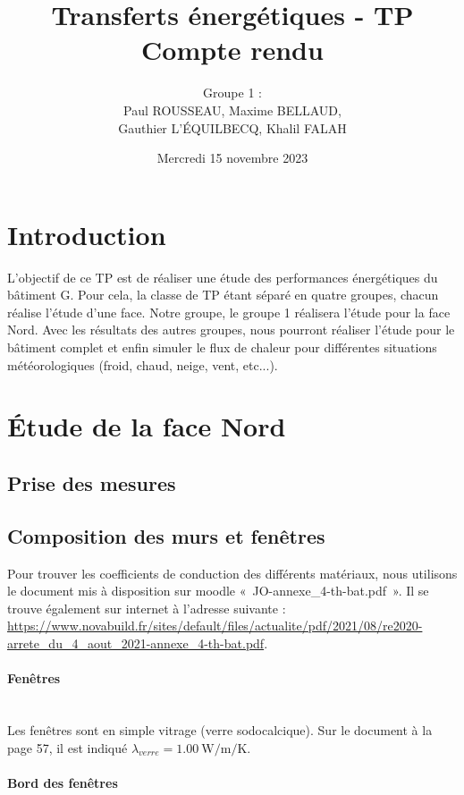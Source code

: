 \documentclass[12pt, a4paper]{article}
\title{Transferts énergétiques - TP \\
Compte rendu}
\author{Groupe 1 : \\
Paul ROUSSEAU, Maxime BELLAUD, \\
Gauthier L'ÉQUILBECQ, Khalil FALAH}
\date{Mercredi 15 novembre 2023}
\newcommand{\lambdaVerre}{\ensuremath{\lambda_{verre}}}
\begin{document}
\maketitle

\tableofcontents

\section{Introduction}

L'objectif de ce TP est de réaliser une étude des performances énergétiques du bâtiment G. Pour cela, la classe de TP étant séparé en quatre groupes, chacun réalise l'étude d'une face. Notre groupe, le groupe 1 réalisera l'étude pour la face Nord. Avec les résultats des autres groupes, nous pourront réaliser l'étude pour le bâtiment complet et enfin simuler le flux de chaleur pour différentes situations météorologiques (froid, chaud, neige, vent, etc...).

\section{Étude de la face Nord}

\subsection{Prise des mesures}

\subsection{Composition des murs et fenêtres}

Pour trouver les coefficients de conduction des différents matériaux, nous utilisons le document mis à disposition sur moodle «~JO-annexe\_4-th-bat.pdf~». Il se trouve également sur internet à l'adresse suivante : \url{https://www.novabuild.fr/sites/default/files/actualite/pdf/2021/08/re2020-arrete_du_4_aout_2021-annexe_4-th-bat.pdf}.

\paragraph{Fenêtres} \phantom{.} \\

Les fenêtres sont en simple vitrage (verre sodocalcique). Sur le document à la page 57, il est indiqué $\boxed{\lambdaVerre = \SI{1.00}{\watt\per\meter\per\kelvin}}$.

\paragraph{Bord des fenêtres} \phantom{.} \\
\end{document}

